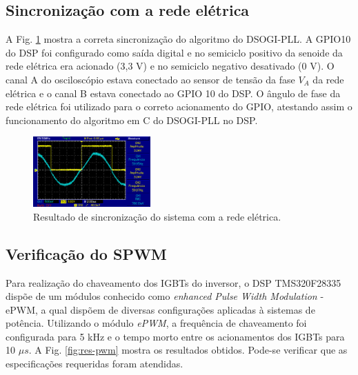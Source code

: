 \subsection{Sincronização com a rede elétrica}

A Fig. \ref{fig:res-sincronizacao} mostra a correta sincronização do algoritmo do DSOGI-PLL. 
A GPIO10 do DSP foi configurado como saída digital e no semiciclo positivo da senoide da rede elétrica era acionado (3,3 V) e no semiciclo negativo desativado (0 V).
O canal A do osciloscópio estava conectado ao sensor de tensão da fase $V_A$ da rede elétrica e o canal B estava conectado ao GPIO 10 do DSP.
O ângulo de fase da rede elétrica foi utilizado para o correto acionamento do GPIO, atestando assim o funcionamento do algoritmo em C do DSOGI-PLL no DSP.

\begin{figure}[!hbt]
	\begin{center}
    \includegraphics[width=0.4\textwidth]{figuras/resultados_sincronizacao.png}
	\caption{Resultado de sincronização do sistema com a rede elétrica.}
    \label{fig:res-sincronizacao}
    \end{center}
\end{figure}

\subsection{Verificação do SPWM}

Para realização do chaveamento dos IGBTs do inversor, o DSP TMS320F28335 dispõe
de um módulos conhecido como \textit{enhanced Pulse Width Modulation} - ePWM, a qual dispõem de diversas configurações aplicadas à sistemas de potência.
Utilizando o módulo \textit{ePWM}, a frequência de chaveamento foi configurada para 5 kHz e o tempo morto entre os acionamentos dos IGBTs para 10 $\mu s$.
A Fig. \ref{fig:res-pwm} mostra os resultados obtidos. Pode-se verificar que as especificações requeridas foram atendidas.

